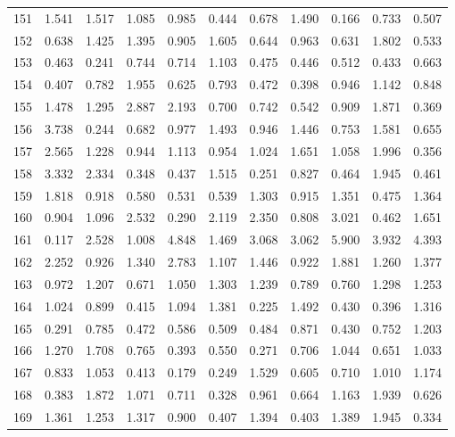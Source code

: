 \begin{tabular}{lrrrrrrrrrr}
151 &  1.541 &  1.517 &  1.085 &  0.985 &  0.444 &  0.678 &  1.490 &  0.166 &  0.733 &  0.507 \\
152 &  0.638 &  1.425 &  1.395 &  0.905 &  1.605 &  0.644 &  0.963 &  0.631 &  1.802 &  0.533 \\
153 &  0.463 &  0.241 &  0.744 &  0.714 &  1.103 &  0.475 &  0.446 &  0.512 &  0.433 &  0.663 \\
154 &  0.407 &  0.782 &  1.955 &  0.625 &  0.793 &  0.472 &  0.398 &  0.946 &  1.142 &  0.848 \\
155 &  1.478 &  1.295 &  2.887 &  2.193 &  0.700 &  0.742 &  0.542 &  0.909 &  1.871 &  0.369 \\
156 &  3.738 &  0.244 &  0.682 &  0.977 &  1.493 &  0.946 &  1.446 &  0.753 &  1.581 &  0.655 \\
157 &  2.565 &  1.228 &  0.944 &  1.113 &  0.954 &  1.024 &  1.651 &  1.058 &  1.996 &  0.356 \\
158 &  3.332 &  2.334 &  0.348 &  0.437 &  1.515 &  0.251 &  0.827 &  0.464 &  1.945 &  0.461 \\
159 &  1.818 &  0.918 &  0.580 &  0.531 &  0.539 &  1.303 &  0.915 &  1.351 &  0.475 &  1.364 \\
160 &  0.904 &  1.096 &  2.532 &  0.290 &  2.119 &  2.350 &  0.808 &  3.021 &  0.462 &  1.651 \\
161 &  0.117 &  2.528 &  1.008 &  4.848 &  1.469 &  3.068 &  3.062 &  5.900 &  3.932 &  4.393 \\
162 &  2.252 &  0.926 &  1.340 &  2.783 &  1.107 &  1.446 &  0.922 &  1.881 &  1.260 &  1.377 \\
163 &  0.972 &  1.207 &  0.671 &  1.050 &  1.303 &  1.239 &  0.789 &  0.760 &  1.298 &  1.253 \\
164 &  1.024 &  0.899 &  0.415 &  1.094 &  1.381 &  0.225 &  1.492 &  0.430 &  0.396 &  1.316 \\
165 &  0.291 &  0.785 &  0.472 &  0.586 &  0.509 &  0.484 &  0.871 &  0.430 &  0.752 &  1.203 \\
166 &  1.270 &  1.708 &  0.765 &  0.393 &  0.550 &  0.271 &  0.706 &  1.044 &  0.651 &  1.033 \\
167 &  0.833 &  1.053 &  0.413 &  0.179 &  0.249 &  1.529 &  0.605 &  0.710 &  1.010 &  1.174 \\
168 &  0.383 &  1.872 &  1.071 &  0.711 &  0.328 &  0.961 &  0.664 &  1.163 &  1.939 &  0.626 \\
169 &  1.361 &  1.253 &  1.317 &  0.900 &  0.407 &  1.394 &  0.403 &  1.389 &  1.945 &  0.334 \\

\end{tabular}
